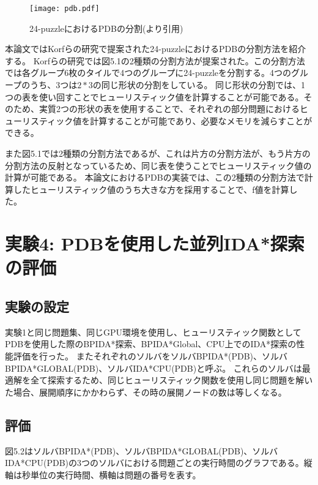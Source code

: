\documentclass[a4paper,11pt,oneside,openany]{jsbook}
\begin{document}
\begin{figure}[H]
\begin{center}
\texttt{[image: pdb.pdf]}
\caption{24-puzzleにおけるPDBの分割(\cite{PDB}より引用)}
\end{center}
\end{figure}


本論文ではKorfらの研究\cite{KF02}で提案された24-puzzleにおけるPDBの分割方法を紹介する。
Korfらの研究\cite{KF02}では図5.1の2種類の分割方法が提案された。この分割方法では各グループ6枚のタイルで4つのグループに24-puzzleを分割する。4つのグループのうち、3つは$2*3$の同じ形状の分割をしている。
同じ形状の分割では、1つの表を使い回すことでヒューリスティック値を計算することが可能である。そのため、実質2つの形状の表を使用することで、それぞれの部分問題におけるヒューリスティック値を計算することが可能であり、必要なメモリを減らすことができる。

また図5.1では2種類の分割方法であるが、これは片方の分割方法が、もう片方の分割方法の反射となっているため、同じ表を使うことでヒューリスティック値の計算が可能である。
本論文におけるPDBの実装では、この2種類の分割方法で計算したヒューリスティック値のうち大きな方を採用することで、f値を計算した。




\section{実験4: PDBを使用した並列IDA*探索の評価}
\subsection{実験の設定}
実験1と同じ問題集、同じGPU環境を使用し、ヒューリスティック関数としてPDBを使用した際のBPIDA*探索、BPIDA*Global、CPU上でのIDA*探索の性能評価を行った。
またそれぞれのソルバをソルバBPIDA*(PDB)、ソルバBPIDA*GLOBAL(PDB)、ソルバIDA*CPU(PDB)と呼ぶ。
これらのソルバは最適解を全て探索するため、同じヒューリスティック関数を使用し同じ問題を解いた場合、展開順序にかかわらず、その時の展開ノードの数は等しくなる。

\subsection{評価}
図5.2はソルバBPIDA*(PDB)、ソルバBPIDA*GLOBAL(PDB)、ソルバIDA*CPU(PDB)の3つのソルバにおける問題ごとの実行時間のグラフである。縦軸は秒単位の実行時間、横軸は問題の番号を表す。
\end{document}

